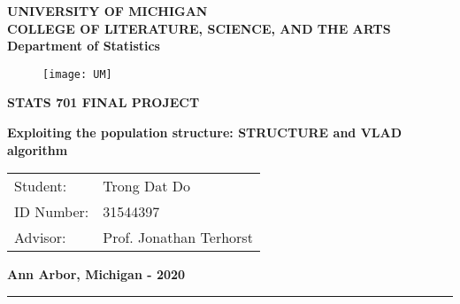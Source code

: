 \begin{titlepage}
\begin{center}
{\bfseries UNIVERSITY OF MICHIGAN\\
COLLEGE OF LITERATURE, SCIENCE, AND THE ARTS\\
Department of Statistics}
\end{center}

\vspace*{1cm}
\begin{figure}[!ht]
\centering
\texttt{[image: UM]}
\end{figure}

\vspace*{2cm}

\begin{center}
{\Large \bfseries STATS 701 FINAL PROJECT}

\vspace*{1cm}
{\huge \bfseries Exploiting the population structure: STRUCTURE and VLAD algorithm}
\end{center}
 \vspace*{1cm}
\begin{center}
\parbox[l]{8cm}{
\bfseries
\begin{tabular}{ l  l }
Student:& {\Large Trong Dat Do}\\
ID Number: & 31544397 \\
Advisor:& Prof. Jonathan Terhorst\\
\end{tabular}
}
\end{center}

\vfill
 \centerline{\bf Ann Arbor, Michigan - 2020}
\end{titlepage}
\newpage
\vspace*{5cm}
\vfill
\hrule

\thispagestyle{empty}